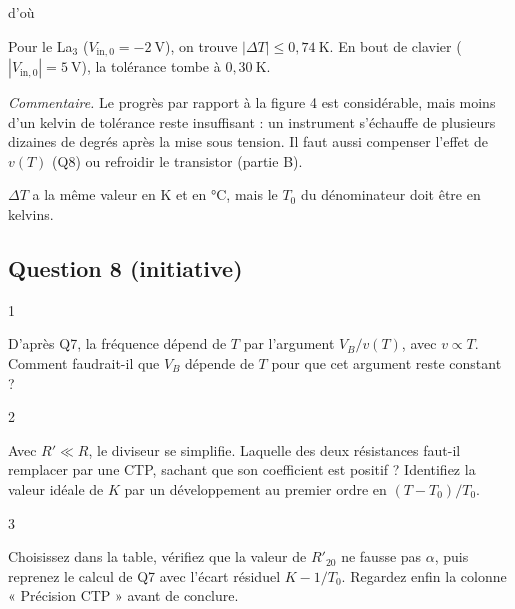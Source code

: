 \documentclass[11pt,a4paper]{article}
\newcommand{\equationajustee}[1]{%
  \sbox{\boiteequation}{$\displaystyle #1$}%
  \ifdim\wd\boiteequation>\linewidth
    \[\resizebox{\linewidth}{!}{\usebox{\boiteequation}}\]%
  \else
    \[#1\]%
  \fi}
\begin{document}
d'où

\equationajustee{\begin{aligned}
|\Delta T|&\leqslant\frac{0{,}0035\,T_0}{\ln2\,|V_{\mathrm{in},0}|}\\
&=\boxed{\frac{1{,}48\ \mathrm{K\cdot V}}{|V_{\mathrm{in},0}|}}
\end{aligned}}

Pour le La\(_3\) (\(V_{\mathrm{in},0}=-2\ \mathrm{V}\)), on trouve \(\boxed{|\Delta T|\leqslant0{,}74\ \mathrm{K}}\). En bout de clavier (\(|V_{\mathrm{in},0}|=5\ \mathrm{V}\)), la tolérance tombe à \(0{,}30\ \mathrm{K}\).

\emph{Commentaire.} Le progrès par rapport à la figure 4 est considérable, mais moins d'un kelvin de tolérance reste insuffisant : un instrument s'échauffe de plusieurs dizaines de degrés après la mise sous tension. Il faut aussi compenser l'effet de \(v(T)\) (Q8) ou refroidir le transistor (partie B).

\begin{piege}

\(\Delta T\) a la même valeur en K et en °C, mais le \(T_0\) du dénominateur doit être en kelvins.

\end{piege}

\hypertarget{question-8-initiative}{%
\subsection{Question 8 (initiative)}\label{question-8-initiative}}

\begin{indication}{1}

D'après Q7, la fréquence dépend de \(T\) par l'argument \(V_B/v(T)\), avec \(v\propto T\). Comment faudrait-il que \(V_B\) dépende de \(T\) pour que cet argument reste constant ?

\end{indication}

\begin{indication}{2}

Avec \(R'\ll R\), le diviseur se simplifie. Laquelle des deux résistances faut-il remplacer par une CTP, sachant que son coefficient est positif ? Identifiez la valeur idéale de \(K\) par un développement au premier ordre en \((T-T_0)/T_0\).

\end{indication}

\begin{indication}{3}

Choisissez dans la table, vérifiez que la valeur de \(R'_{20}\) ne fausse pas \(\alpha\), puis reprenez le calcul de Q7 avec l'écart résiduel \(K-1/T_0\). Regardez enfin la colonne « Précision CTP » avant de conclure.

\end{indication}
\end{document}
